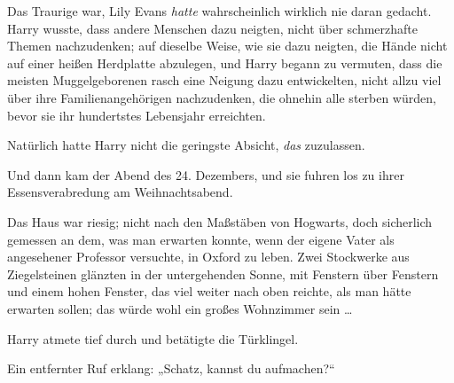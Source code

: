 Das Traurige war, Lily Evans \emph{hatte} wahrscheinlich wirklich nie daran gedacht. Harry wusste, dass andere Menschen dazu neigten, nicht über schmerzhafte Themen nachzudenken; auf dieselbe Weise, wie sie dazu neigten, die Hände nicht auf einer heißen Herdplatte abzulegen, und Harry begann zu vermuten, dass die meisten Muggelgeborenen rasch eine Neigung dazu entwickelten, nicht allzu viel über ihre Familienangehörigen nachzudenken, die ohnehin alle sterben würden, bevor sie ihr hundertstes Lebensjahr erreichten.

Natürlich hatte Harry nicht die geringste Absicht, \emph{das} zuzulassen.

Und dann kam der Abend des 24. Dezembers, und sie fuhren los zu ihrer Essensverabredung am Weihnachtsabend.

\later

Das Haus war riesig; nicht nach den Maßstäben von Hogwarts, doch sicherlich gemessen an dem, was man erwarten konnte, wenn der eigene Vater als angesehener Professor versuchte, in Oxford zu leben. Zwei Stockwerke aus Ziegelsteinen glänzten in der untergehenden Sonne, mit Fenstern über Fenstern und einem hohen Fenster, das viel weiter nach oben reichte, als man hätte erwarten sollen; das würde wohl ein großes Wohnzimmer sein …

Harry atmete tief durch und betätigte die Türklingel.

Ein entfernter Ruf erklang:
„Schatz, kannst du aufmachen?“


